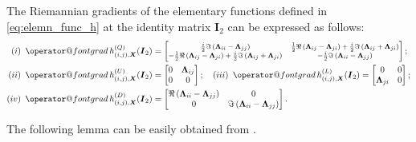 \documentclass[final,onefignum,onetabnum]{siamart190516}
\makeatletter
\newcommand{\matr}[1]{\boldsymbol{#1}}
\newcommand{\ProjGrad}[2]{\mathop{{\operator@font grad} }#1(#2)}
\newcommand{\hij}[3]{h^{(Q)}_{(#1,#2), #3}}
\newcommand{\ui}{i}
\makeatother
\begin{document}
\begin{lemma}\label{lem:ProjGradSubmatrix}
The Riemannian gradients of the elementary functions defined in \cref{eq:elemn_func_h} at the identity matrix $\matr{I}_2$ can be expressed as follows:
\begin{align*}
(i)\ &\ProjGrad{\hij{i}{j}{\matr{X}}}{\matr{I}_2} = {\footnotesize \begin{bmatrix}
	\frac{\ui}{2}\Im\left(\matr{\Lambda}_{ii}-\matr{\Lambda}_{jj}\right) &
	\frac{1}{2}\Re\left(\matr{\Lambda}_{ij}-\matr{\Lambda}_{ji}\right)+\frac{\ui}{2}\Im\left(\matr{\Lambda}_{ij}+\matr{\Lambda}_{ji}\right)  \\
	-\frac{1}{2}\Re\left(\matr{\Lambda}_{ij}-\matr{\Lambda}_{ji}\right)+\frac{\ui}{2}\Im\left(\matr{\Lambda}_{ij}+\matr{\Lambda}_{ji}\right) &  -\frac{\ui}{2}\Im\left(\matr{\Lambda}_{ii}-\matr{\Lambda}_{jj}\right)
\end{bmatrix};}\label{eq-gradient-h}\\
(ii)\ &\ProjGrad{h^{(U)}_{(i,j),\matr{X}}}{\matr{I}_2} 
= \begin{bmatrix}
0 &
\matr{\Lambda}_{ij} \\
0  &  0
\end{bmatrix};\quad
(iii)\ \ProjGrad{h^{(L)}_{(i,j),\matr{X}}}{\matr{I}_2} 
= \begin{bmatrix}
0 &
0 \\
\matr{\Lambda}_{ji}  &  0
\end{bmatrix};\\
(iv)\ &\ProjGrad{h^{(D)}_{(i,j),\matr{X}}}{\matr{I}_2} =  
\begin{bmatrix}
\Re\left(\matr{\Lambda}_{ii}-\matr{\Lambda}_{jj}\right) &
0 \\
0  &   \Im\left(\matr{\Lambda}_{ii}-\matr{\Lambda}_{jj}\right)
\end{bmatrix}. 
\end{align*}
\end{lemma}

The following lemma can be easily obtained from .
\end{document}
